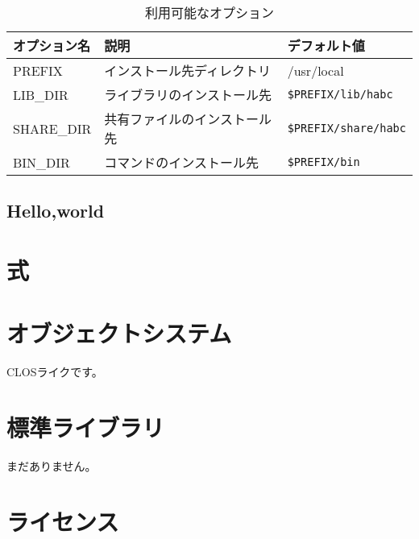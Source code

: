 \documentclass{article}
\begin{document}
\begin{table}
\centering
\caption{利用可能なオプション}\label{option}
\begin{tabular}{|l|l|l|}
オプション名  & 説明 & デフォルト値 \\\hline
PREFIX        & インストール先ディレクトリ & /usr/local \\
LIB_DIR       & ライブラリのインストール先 & \verb!$PREFIX/lib/habc! \\
SHARE_DIR     & 共有ファイルのインストール先 & \verb!$PREFIX/share/habc! \\
BIN_DIR       & コマンドのインストール先     & \verb!$PREFIX/bin!
\end{tabular}
\end{table}


\subsection{Hello,world}

\section{式}

\section{オブジェクトシステム}
CLOSライクです。

\section{標準ライブラリ}
まだありません。
\section{ライセンス}
\end{document}
